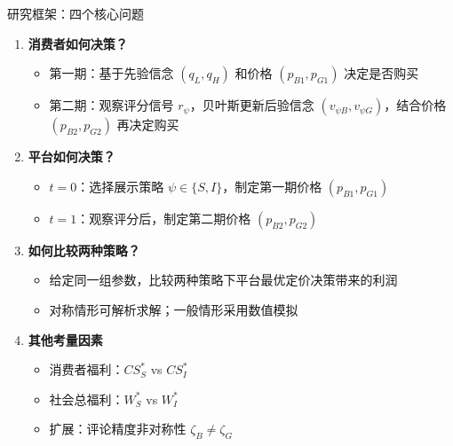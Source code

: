 \documentclass[aspectratio=169,10pt]{beamer}
\begin{document}
\begin{frame}{研究框架：四个核心问题}
\begin{enumerate}
    \item \textbf{消费者如何决策？}
    \begin{itemize}
        \item 第一期：基于先验信念 $(q_L, q_H)$ 和价格 $(p_{B1}, p_{G1})$ 决定是否购买
        \item 第二期：观察评分信号 $r_\psi$，贝叶斯更新后验信念 $(v_{\psi B}, v_{\psi G})$，结合价格 $(p_{B2}, p_{G2})$ 再决定购买
    \end{itemize}

    \vspace{6pt}
    \item \textbf{平台如何决策？}
    \begin{itemize}
        \item $t=0$：选择展示策略 $\psi \in \{S, I\}$，制定第一期价格 $(p_{B1}, p_{G1})$
        \item $t=1$：观察评分后，制定第二期价格 $(p_{B2}, p_{G2})$
    \end{itemize}

    \vspace{6pt}
    \item \textbf{如何比较两种策略？}
    \begin{itemize}
        \item 给定同一组参数，比较两种策略下平台最优定价决策带来的利润
        \item 对称情形可解析求解；一般情形采用数值模拟
    \end{itemize}

    \vspace{6pt}
    \item \textbf{其他考量因素}
    \begin{itemize}
        \item 消费者福利：$CS_S^*$ vs $CS_I^*$
        \item 社会总福利：$W_S^*$ vs $W_I^*$
        \item 扩展：评论精度非对称性 $\zeta_B \neq \zeta_G$
    \end{itemize}
\end{enumerate}
\end{frame}
\end{document}
